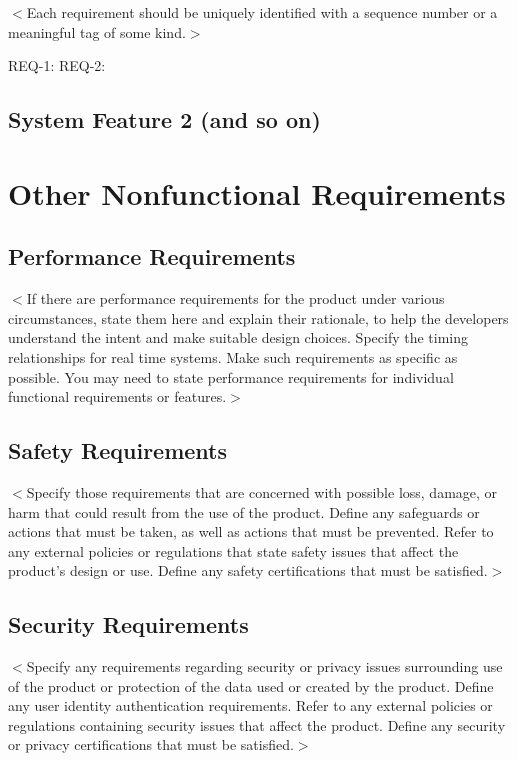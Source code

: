 \documentclass{scrreprt}
\begin{document}
$<$Each requirement should be uniquely identified with a sequence number or a 
meaningful tag of some kind.$>$

REQ-1:	REQ-2:

\section{System Feature 2 (and so on)}


\chapter{Other Nonfunctional Requirements}

\section{Performance Requirements}
$<$If there are performance requirements for the product under various 
circumstances, state them here and explain their rationale, to help the 
developers understand the intent and make suitable design choices. Specify the 
timing relationships for real time systems. Make such requirements as specific 
as possible. You may need to state performance requirements for individual 
functional requirements or features.$>$

\section{Safety Requirements}
$<$Specify those requirements that are concerned with possible loss, damage, or 
harm that could result from the use of the product. Define any safeguards or 
actions that must be taken, as well as actions that must be prevented. Refer to 
any external policies or regulations that state safety issues that affect the 
product’s design or use. Define any safety certifications that must be 
satisfied.$>$

\section{Security Requirements}
$<$Specify any requirements regarding security or privacy issues surrounding use 
of the product or protection of the data used or created by the product. Define 
any user identity authentication requirements. Refer to any external policies or 
regulations containing security issues that affect the product. Define any 
security or privacy certifications that must be satisfied.$>$
\end{document}
